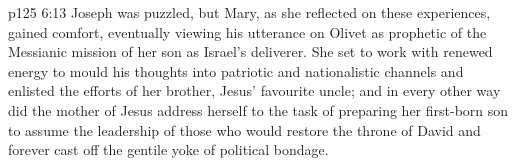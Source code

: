 \vs p125 6:13 \pc Joseph was puzzled, but Mary, as she reflected on these experiences, gained comfort, eventually viewing his utterance on Olivet as prophetic of the Messianic mission of her son as Israel’s deliverer. She set to work with renewed energy to mould his thoughts into patriotic and nationalistic channels and enlisted the efforts of her brother, Jesus’ favourite uncle; and in every other way did the mother of Jesus address herself to the task of preparing her first\hyp{}born son to assume the leadership of those who would restore the throne of David and forever cast off the gentile yoke of political bondage.
\quizlink
